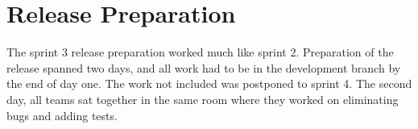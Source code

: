 \section{Release Preparation}

The sprint 3 release preparation worked much like sprint 2. Preparation of the release spanned two days, and all work had to be in the development branch by the end of day one. The work not included was postponed to sprint 4. The second day, all teams sat together in the same room where they worked on eliminating bugs and adding tests.
